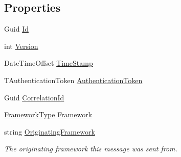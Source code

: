 \subsection*{Properties}
\begin{DoxyCompactItemize}
\item 
Guid \hyperlink{classCqrs_1_1WebApi_1_1HelpPageConfig_1_1UserCreatedEvent_a4b16a2634b2d298f5cca25ab9ca40d32_a4b16a2634b2d298f5cca25ab9ca40d32}{Id}
\item 
int \hyperlink{classCqrs_1_1WebApi_1_1HelpPageConfig_1_1UserCreatedEvent_ac58e3523e24fb4c936146839e4a717a9_ac58e3523e24fb4c936146839e4a717a9}{Version}
\item 
Date\+Time\+Offset \hyperlink{classCqrs_1_1WebApi_1_1HelpPageConfig_1_1UserCreatedEvent_a413c824200dd34f9a0329641fbea731d_a413c824200dd34f9a0329641fbea731d}{Time\+Stamp}
\item 
T\+Authentication\+Token \hyperlink{classCqrs_1_1WebApi_1_1HelpPageConfig_1_1UserCreatedEvent_a02e51969b7b6c8af4790757dc26cc480_a02e51969b7b6c8af4790757dc26cc480}{Authentication\+Token}
\item 
Guid \hyperlink{classCqrs_1_1WebApi_1_1HelpPageConfig_1_1UserCreatedEvent_aa62add44755ea01cd6b98a7d5e7a9bd0_aa62add44755ea01cd6b98a7d5e7a9bd0}{Correlation\+Id}
\item 
\hyperlink{namespaceCqrs_1_1Messages_af06a7e6cd2609043d0f2f5f3419f81e3_af06a7e6cd2609043d0f2f5f3419f81e3}{Framework\+Type} \hyperlink{classCqrs_1_1WebApi_1_1HelpPageConfig_1_1UserCreatedEvent_a2f301c0c2f0c785f42670e9de5bec04a_a2f301c0c2f0c785f42670e9de5bec04a}{Framework}
\item 
string \hyperlink{classCqrs_1_1WebApi_1_1HelpPageConfig_1_1UserCreatedEvent_a5d4fbf202d00e1a969a763e64b69084d_a5d4fbf202d00e1a969a763e64b69084d}{Originating\+Framework}
\begin{DoxyCompactList}\small\item\em The originating framework this message was sent from. \end{DoxyCompactList}\item 

\end{DoxyCompactItemize}

